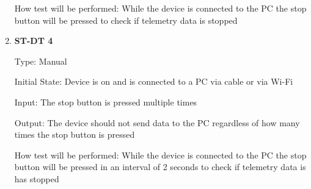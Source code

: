 \documentclass[12pt, titlepage]{article}
\begin{document}
\begin{enumerate}
            
  How test will be performed: While the device is connected to the PC the stop button will be pressed to check if telemetry data is stopped\\

  \item{\bf{ST-DT 4}}
  
  Type: Manual
            
  Initial State: Device is on and is connected to a PC via cable or via Wi-Fi
            
  Input: The stop button is pressed multiple times
            
  Output: The device should not send data to the PC regardless of how many times the stop button is pressed
  
            
  How test will be performed: While the device is connected to the PC the stop button will be pressed in an interval of 2 seconds to check if telemetry data is has stopped\\

  \end{enumerate}
\end{document}
